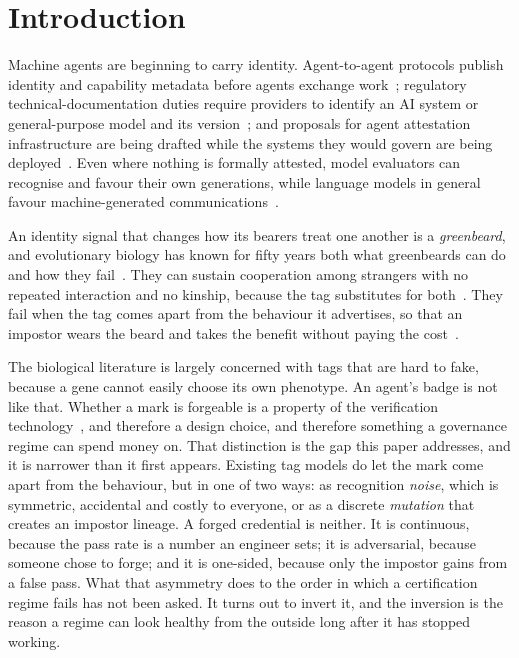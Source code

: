 
\section{Introduction}
\label{sec:intro}

Machine agents are beginning to carry identity. Agent-to-agent protocols
publish identity and capability metadata before agents exchange
work~\citep{a2a2026spec}; regulatory technical-documentation duties require
providers to identify an AI system or general-purpose model and its
version~\citep{euaiact2024}; and proposals for agent attestation infrastructure
are being drafted while the systems they would govern are being
deployed~\citep{chan2024visibility,chan2025infrastructure,shavit2023practices}.
Even where nothing is formally attested, model evaluators can recognise and
favour their own generations, while language models in general favour
machine-generated communications~\citep{panickssery2024llm,laurito2025aiai}.

An identity signal that changes how its bearers treat one another is a
\emph{greenbeard}, and evolutionary biology has known for fifty years both what
greenbeards can do and how they
fail~\citep{hamilton1964genetical1,dawkins1976selfish}. They can sustain
cooperation among strangers with no repeated interaction and no kinship,
because the tag substitutes for
both~\citep{riolo2001evolution,traulsen2003minimal}. They fail when the tag
comes apart from the behaviour it advertises, so that an impostor wears the
beard and takes the benefit without paying the
cost~\citep{roberts2002does,jansen2006altruism,gardner2010greenbeards}.

The biological literature is largely concerned with tags that are hard to fake,
because a gene cannot easily choose its own phenotype. An agent's badge is not
like that. Whether a mark is forgeable is a property of the verification
technology~\citep{jovanovic2024watermarkstealing,anbiaee2026threatmodeling}, and
therefore a design choice, and therefore something a governance regime can spend
money on. That distinction is the gap this paper addresses, and it is narrower
than it first appears. Existing tag models do let the mark come apart from the
behaviour, but in one of two ways: as recognition \emph{noise}, which is
symmetric, accidental and costly to everyone, or as a discrete \emph{mutation}
that creates an impostor lineage. A forged credential is neither. It is
continuous, because the pass rate is a number an engineer sets; it is
adversarial, because someone chose to forge; and it is one-sided, because only
the impostor gains from a false pass. What that asymmetry does to the order in
which a certification regime fails has not been asked. It turns out to invert
it, and the inversion is the reason a regime can look healthy from the outside
long after it has stopped working.

